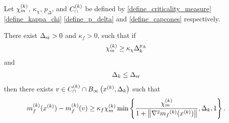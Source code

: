 % 

\begin{theorem}
\label{sufficient_reduction_theorem}
Let 
${\chi_m^{(k)}}$,
$\kappa_{\chi}$,
$p_{\Delta}$,
and ${C^{(k)}_{\cap}}$
be defined by
\cref{define_criticality_measure}
\cref{define_kappa_chi}
\cref{define_p_delta}
and \cref{define_capcones}
respectively.



There exist ${\Delta_{\textrm{sr}}}>0$ and $\kappa_f > 0$, such that if
\begin{align}
{\chi_m^{(k)}} \ge \kappa_{\chi} \Delta_k^{p_{\Delta}} \label{sr_chi_big_enough}
\end{align}
and
\begin{align}
\Delta_k \le {\Delta_{\textrm{sr}}} \label{sr_delta_small_enough}
\end{align}
then there exists $v \in {C^{(k)}_{\cap}} \cap { B_{\infty}\left(x^{(k)}, \Delta_k\right) }$ such that
\begin{align*}
m_f^{(k)}(x^{(k)}) - m_f^{(k)}(v)
\ge \kappa_f {\chi_m^{(k)}} \min\left\{ \frac{{\chi_m^{(k)}}}{1+\left\|\nabla^2 {{m}_f}^{(k)}(x^{(k)})\right\|}, \Delta_k, 1 \right\}.
\end{align*}

\end{theorem}

